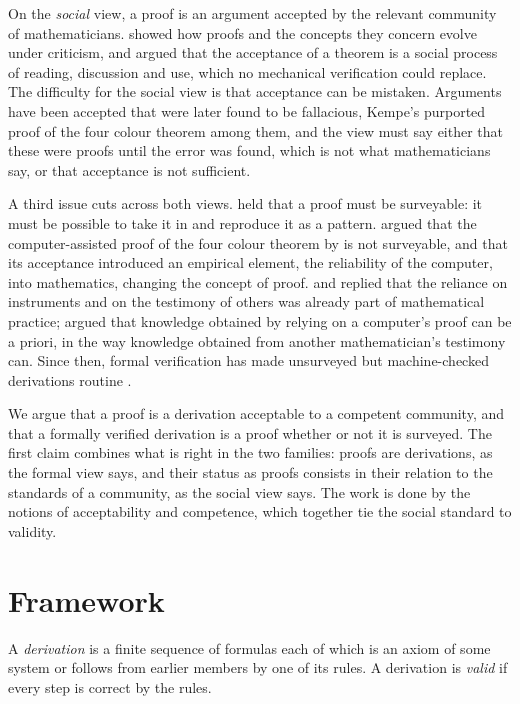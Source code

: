 \documentclass{situationist-preprint}
\begin{document}
On the \emph{social} view, a proof is an argument accepted by the relevant community of mathematicians. \citet{Lakatos1976} showed how proofs and the concepts they concern evolve under criticism, and \citet{DeMilloEtAl1979} argued that the acceptance of a theorem is a social process of reading, discussion and use, which no mechanical verification could replace. The difficulty for the social view is that acceptance can be mistaken. Arguments have been accepted that were later found to be fallacious, Kempe's purported proof of the four colour theorem among them, and the view must say either that these were proofs until the error was found, which is not what mathematicians say, or that acceptance is not sufficient.

A third issue cuts across both views. \citet{Wittgenstein1956} held that a proof must be surveyable: it must be possible to take it in and reproduce it as a pattern. \citet{Tymoczko1979} argued that the computer-assisted proof of the four colour theorem by \citet{AppelHaken1977} is not surveyable, and that its acceptance introduced an empirical element, the reliability of the computer, into mathematics, changing the concept of proof. \citet{Teller1980} and \citet{DetlefsenLuker1980} replied that the reliance on instruments and on the testimony of others was already part of mathematical practice; \citet{Burge1998} argued that knowledge obtained by relying on a computer's proof can be a priori, in the way knowledge obtained from another mathematician's testimony can. Since then, formal verification has made unsurveyed but machine-checked derivations routine \citep{Hales2008,Harrison2008}.

We argue that a proof is a derivation acceptable to a competent community, and that a formally verified derivation is a proof whether or not it is surveyed. The first claim combines what is right in the two families: proofs are derivations, as the formal view says, and their status as proofs consists in their relation to the standards of a community, as the social view says. The work is done by the notions of acceptability and competence, which together tie the social standard to validity.

\section{Framework}

\begin{definition}[Derivation]\label{d:deriv}
A \emph{derivation} is a finite sequence of formulas each of which is an axiom of some system or follows from earlier members by one of its rules. A derivation is \emph{valid} if every step is correct by the rules.
\end{definition}
\end{document}
